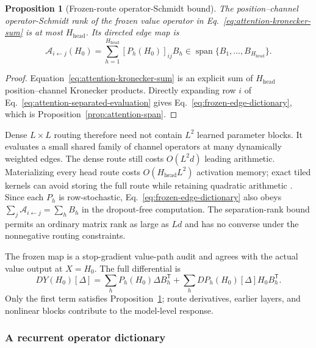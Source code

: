 \documentclass[10pt]{article}
\newcommand{\Span}{\operatorname{span}}
\newtheorem{proposition}[theorem]{Proposition}
\theoremstyle{definition}
\theoremstyle{remark}
\newcommand{\BookSubsection}[1]{\subsubsection{#1}}
\begin{document}
\begin{proposition}[Frozen-route operator-Schmidt bound]
\label{prop:attention-separation-rank}
The position--channel operator-Schmidt rank of the frozen value operator in
Eq.~\ref{eq:attention-kronecker-sum} is at most $H_{\mathrm{head}}$.  Its directed edge map is
\begin{equation}
\mathcal A_{i\leftarrow j}(H_0)
=\sum_{h=1}^{H_{\mathrm{head}}}[P_h(H_0)]_{ij}B_h
\in\Span\{B_1,\ldots,B_{H_{\mathrm{head}}}\}.
\label{eq:frozen-edge-dictionary}
\end{equation}
\end{proposition}

\begin{proof}
Equation~\ref{eq:attention-kronecker-sum} is an explicit sum of
$H_{\mathrm{head}}$ position--channel Kronecker products.  Directly expanding row $i$ of
Eq.~\ref{eq:attention-separated-evaluation} gives Eq.~\ref{eq:frozen-edge-dictionary}, which is
Proposition~\ref{prop:attention-span}.
\end{proof}

Dense $L\times L$ routing therefore need not contain $L^2$ learned parameter blocks.  It evaluates
a small shared family of channel operators at many dynamically weighted edges.  The dense route
still costs $O(L^2d)$ leading arithmetic.  Materializing every head route costs
$O(H_{\mathrm{head}}L^2)$ activation memory; exact tiled kernels can avoid storing the full route
while retaining quadratic arithmetic \cite{dao2022flashattention}.  Since each $P_h$ is
row-stochastic, Eq.~\ref{eq:frozen-edge-dictionary} also obeys
$\sum_j\mathcal A_{i\leftarrow j}=\sum_hB_h$ in the dropout-free computation.  The separation-rank
bound permits an ordinary matrix rank as large as $Ld$ and has no converse under the nonnegative
routing constraints.

The frozen map is a stop-gradient value-path audit and agrees with the actual value output at
$X=H_0$.  The full differential is
\begin{equation}
DY(H_0)[\Delta]
=\sum_hP_h(H_0)\Delta B_h^{\mathsf T}
+\sum_hDP_h(H_0)[\Delta]H_0B_h^{\mathsf T}.
\label{eq:attention-full-differential}
\end{equation}
Only the first term satisfies Proposition~\ref{prop:attention-separation-rank}; route derivatives,
earlier layers, and nonlinear blocks contribute to the model-level response.

\BookSubsection{A recurrent operator dictionary}
\end{document}
